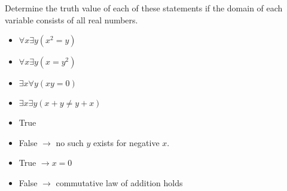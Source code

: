 \documentclass[addpoints]{exam}
\newenvironment{problem}[2][Problem]{\begin{trivlist}
    \item[\hskip \labelsep {\bfseries #1}\hskip \labelsep {\bfseries #2.}]}{\end{trivlist}}
\begin{document}
\begin{sloppypar}
\begin{problem}{18}
Determine the truth value of each of these statements if the domain of each variable consists of all real numbers.
\begin{itemize}
    \item[(a)] $\forall x \exists y (x^2=y)$
    \item[(b)] $\forall x \exists y (x = y^2)$
    \item[(c)] $\exists x \forall y (xy=0) $
    \item[(d)] $\exists x \exists y (x + y \neq y + x) $
\end{itemize}
\end{problem}

\begin{questions}
    \question
    \begin{solution}
        \begin{itemize}
            \item[(a)] True 
            \item[(b)] False $ \longrightarrow $ no such $y$ exists for negative $x$.
            \item[(c)] True $ \longrightarrow x = 0 $
            \item[(d)] False $ \longrightarrow $ commutative law of addition holds   
        \end{itemize}
    \end{solution}
\end{questions}

\end{sloppypar}
\end{document}
